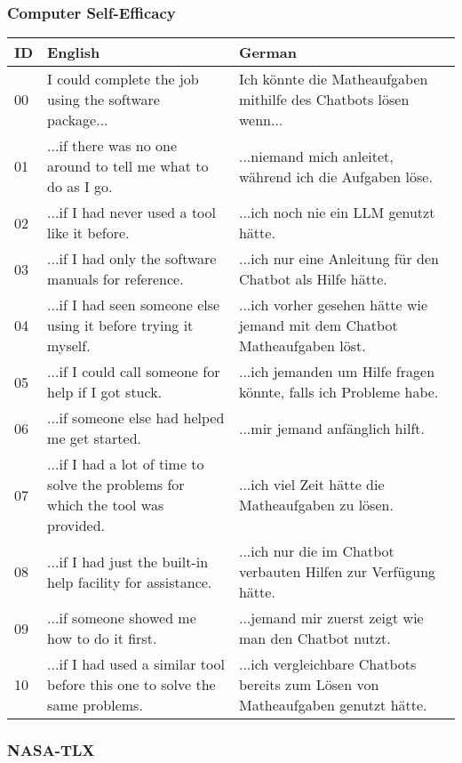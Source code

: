 \clearpage
\subsubsection*{Computer Self-Efficacy}

\begin{ctable}
    \begin{tabularx}{\textwidth}{l|X|X}
        \textbf{ID} & \textbf{English} & \textbf{German} \\
        \hline
        00 & I could complete the job using the software package... & Ich könnte die Matheaufgaben mithilfe des Chatbots lösen wenn... \\
        01 & ...if there was no one around to tell me what to do as I go. & ...niemand mich anleitet, während ich die Aufgaben löse. \\
        02 & ...if I had never used a tool like it before. & ...ich noch nie ein LLM genutzt hätte. \\
        03 & ...if I had only the software manuals for reference. & ...ich nur eine Anleitung für den Chatbot als Hilfe hätte. \\
        04 & ...if I had seen someone else using it before trying it myself. & ...ich vorher gesehen hätte wie jemand mit dem Chatbot Matheaufgaben löst. \\
        05 & ...if I could call someone for help if I got stuck. & ...ich jemanden um Hilfe fragen könnte, falls ich Probleme habe. \\
        06 & ...if someone else had helped me get started. & ...mir jemand anfänglich hilft. \\
        07 & ...if I had a lot of time to solve the problems for which the tool was provided. & ...ich viel Zeit hätte die Matheaufgaben zu lösen. \\
        08 & ...if I had just the built-in help facility for assistance. & ...ich nur die im Chatbot verbauten Hilfen zur Verfügung hätte. \\
        09 & ...if someone showed me how to do it first. & ...jemand mir zuerst zeigt wie man den Chatbot nutzt. \\
        10 & ...if I had used a similar tool before this one to solve the same problems. & ...ich vergleichbare Chatbots bereits zum Lösen von Matheaufgaben genutzt hätte. \\
    \end{tabularx}
\end{ctable}

\clearpage
\subsubsection*{\ac{NASA}-\ac{TLX}}

